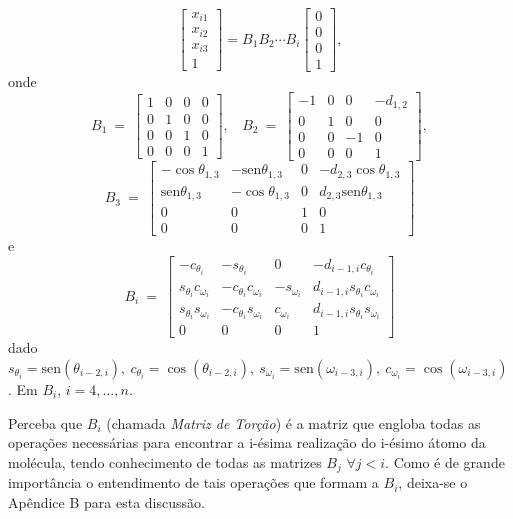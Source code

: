 \documentclass[a4paper,12pt]{article}
\begin{document}
	$$
	\begin{bmatrix}
	x_{i1}\\ 
	x_{i2}\\ 
	x_{i3}\\ 
	1
	\end{bmatrix}
	= B_{1}B_{2}\cdots B_{i}\begin{bmatrix}
	0\\ 
	0\\ 
	0\\ 
	1
	\end{bmatrix},
	$$
	onde
	$$
	B_1\: =\:
	\begin{bmatrix}
	1 & 0 & 0 & 0\\ 
	0 & 1 & 0 & 0\\ 
	0 & 0 & 1 & 0\\ 
	0 & 0 & 0 & 1
	\end{bmatrix},\:\:\:
	\: B_2\: =\:
	\begin{bmatrix}
	-1 & 0 & 0 & -d_{1,2}\\
	0 & 1 & 0 & 0\\ 
	0 & 0 & -1 & 0\\ 
	0 & 0 & 0 & 1
	\end{bmatrix},
	$$
	$$
	B_3\:=\:
	\begin{bmatrix}
	-\cos\theta_{1,3} & -\mbox{sen}\theta_{1,3} & 0 & -d_{2,3}\cos\theta_{1,3}\\ 
	\mbox{sen}\theta_{1,3} & -\cos\theta_{1,3} & 0 & d_{2,3}\mbox{sen}\theta_{1,3}\\ 
	0 & 0 & 1 & 0\\ 
	0 & 0 & 0 & 1
	\end{bmatrix}
	$$
	e
	$$
	B_i\:=\:
	\begin{bmatrix}
	-c_{\theta_{i}} & -s_{\theta_{i}} & 0 & -d_{i-1,i}c_{\theta_{i}}\\ 
	s_{\theta_{i}}c_{\omega_{i}} & -c_{\theta_{i}}c_{\omega_{i}}
	& -s_{\omega_{i}} & d_{i-1,i}s_{\theta_{i}}c_{\omega_{i}}\\ 
	s_{\theta_{i}}s_{\omega_{i}} & -c_{\theta_{i}}s_{\omega_{i}} & c_{\omega_{i}} & d_{i-1,i}s_{\theta_{i}}s_{\omega_{i}}\\ 
	0 & 0 & 0 & 1
	\end{bmatrix}
	$$
	dado $s_{\theta_{i}}=\mbox{sen} (\theta_{i-2, i}),\: c_{\theta_{i}}=\cos (\theta_{i-2, i}),\: s_{\omega_{i}}=\mbox{sen} (\omega_{i-3, i}),\: c_{\omega_{i}}=\cos (\omega_{i-3, i})$. Em $B_i$, $i=4, ..., n$.
	
	
	Perceba que $B_i$ (chamada \textit{Matriz de Torção}) é a matriz que engloba todas as operações necessárias para encontrar a i-ésima realização do i-ésimo átomo da molécula, tendo conhecimento de todas as matrizes $B_j$ $\forall j < i$. Como é de grande importância o entendimento de tais operações que formam a $B_i$, deixa-se o Apêndice B para esta discussão.
	
\end{document}
